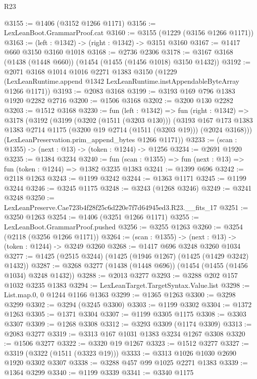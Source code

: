 \begin{lexlean}{R23}
\begin{coremodule}
@3155 := @1406 (@3152 @1266 @1171)
@3156 := LexLeanBoot.GrammarProof.cat
@3160 := @3155 (@1229 (@3156 @1266 @1171))
@3163 := (left : @1342) -> (right : @1342) -> @3151 @3160
@3167 := @1417 @660 @3150 @3160 @1018
@3168 := @2736 @2306
@3178 := @3167 @3168 (@1438 (@1448 @660)) (@1454 (@1455 (@1456 @1018) @3150 @1432))
@3192 := @2071
    @3168
    @1014
    @1016
    @2271
    @1383
    @3150
    (@1229 (LexLeanRuntime.append @1342 LexLeanRuntime.instAppendableByteArray @1266 @1171))
@3193 := @2083 @3168
@3199 := @3193 @169 @796 @1383 @1920 @2282 @2716
@3200 := @1506 @3168
@3202 := @3200 @130 @2282
@3203 := @1512 @3168
@3230 := fun (left : @1342) =>
  fun (right : @1342) =>
  @3178
    (@3192
      (@3199
        (@3202 (@1511 (@3203 @130)))
        (@3193
          @167
          @173
          @1383
          @1383
          @2714
          @1175
          (@3200 @19 @2714 (@1511 (@3203 @19)))
          (@2024 @3168)))
      (LexLeanPreservation.prim_append_bytes @1266 @1171))
@3233 := (scan : @1355) -> (next : @13) -> (token : @1244) -> @1256
@3234 := @2691 @1920
@3235 := @1384 @3234
@3240 := fun (scan : @1355) => fun (next : @13) => fun (token : @1244) => @1382 @3235 @1383
@3241 := @1399 @696
@3242 := @2118 @1263
@3243 := @1199 @3242
@3244 := @1363 @1171
@3245 := @1199 @3244
@3246 := @3245 @1175
@3248 := @3243 (@1268 @3246)
@3249 := @3241 @3248
@3250 := LexLeanPreserve.Cae723b4f28f25c6d220e7f7d64945ed3.R23.__fits_17
@3251 := @3250 @1263
@3254 := @1406 (@3251 @1266 @1171)
@3255 := LexLeanBoot.GrammarProof.pushed
@3256 := @3255 @1263
@3260 := @3254 (@2118 (@3256 @1266 @1171))
@3264 := (scan : @1355) -> (next : @13) -> (token : @1244) -> @3249 @3260
@3268 := @1417 @696 @3248 @3260 @1034
@3277 := @1425 (@2515 @3244) (@1425 (@1946 @1267) (@1425 (@1429 @3242) @1432))
@3287 := @3268 @3277 (@1438 (@1448 @696)) (@1454 (@1455 (@1456 @1034) @3248 @1432))
@3288 := @2013 @3277
@3293 := @3288 @202 @157 @1032 @3235 @1383
@3294 := LexLeanTarget.TargetSyntax.Value.list
@3298 := List.map.{0, 0} @1244 @1166 @1363
@3299 := @1365 @1263
@3300 := @3298 @3299
@3302 := @3294 (@3245 @3300)
@3303 := @1199 @3302
@3304 := @1372 @1263
@3305 := @1371 @3304
@3307 := @1199 @3305 @1175
@3308 := @3303 @3307
@3309 := @1268 @3308
@3312 := @3293 @3309 (@1174 @3309)
@3313 := @2083 @3277
@3319 := @3313 @167 @1031 @1383 @3234 @1267 @3308
@3320 := @1506 @3277
@3322 := @3320 @19 @1267
@3323 := @1512 @3277
@3327 := @3319 (@3322 (@1511 (@3323 @19)))
@3333 := @3313 @1026 @1030 @2690 @1920 @3302 @3307
@3338 := @3288 @457 @99 @1025 @2271 @1383
@3339 := @1364 @3299
@3340 := @1199 @3339
@3341 := @3340 @1175

\end{coremodule}
\end{lexlean}
